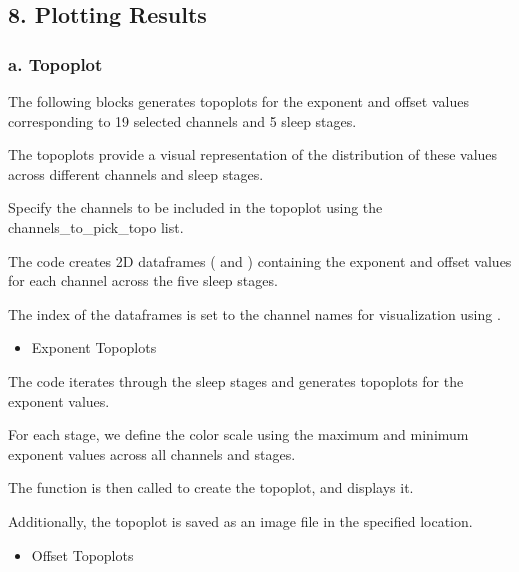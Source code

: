 \documentclass[letterpaper,10pt,english]{sphinxmanual}
\begin{document}
\subsection{8. Plotting Results}
\label{\detokenize{code:plotting-results}}

\subsubsection{a. Topoplot}
\label{\detokenize{code:a-topoplot}}
\sphinxAtStartPar
The following blocks generates topoplots for the exponent and offset values corresponding to 19 selected channels and 5 sleep stages.

\sphinxAtStartPar
The topoplots provide a visual representation of the distribution of these values across different channels and sleep stages.

\sphinxAtStartPar
{}

\sphinxAtStartPar
Specify the channels to be included in the topoplot using the channels\_to\_pick\_topo list.

\sphinxAtStartPar
The code creates 2D dataframes ( and ) containing the exponent and offset values for each channel across the five sleep stages.

\sphinxAtStartPar
The index of the dataframes is set to the channel names for visualization using .

\sphinxAtStartPar
{}
\begin{itemize}
\item {} 
\sphinxAtStartPar
Exponent Topoplots

\end{itemize}

\sphinxAtStartPar
The code iterates through the sleep stages and generates topoplots for the exponent values.

\sphinxAtStartPar
For each stage, we define the color scale using the maximum and minimum exponent values across all channels and stages.

\sphinxAtStartPar
The  function is then called to create the topoplot, and  displays it.

\sphinxAtStartPar
Additionally, the topoplot is saved as an image file in the specified location.
\begin{itemize}
\item {} 
\sphinxAtStartPar
Offset Topoplots

\end{itemize}
\end{document}
